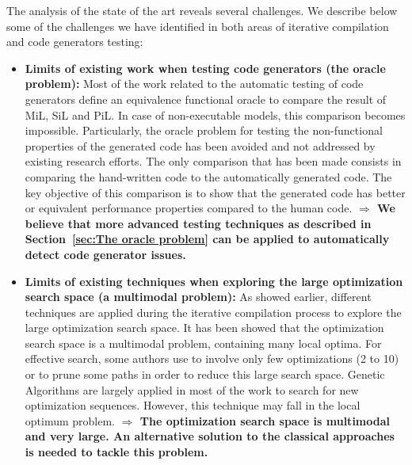 The analysis of the state of the art reveals several challenges. We describe below some of the challenges we have identified in both areas of iterative compilation and code generators testing:
\begin{itemize}
	
\item \textbf{Limits of existing work when testing code generators (the oracle problem):} Most of the work related to the automatic testing of code generators define an equivalence functional oracle to compare the result of MiL, SiL and PiL. In case of non-executable models, this comparison becomes impossible. Particularly, the oracle problem for testing the non-functional properties of the generated code  has been avoided and not addressed by existing research efforts. The only comparison that has been made consists in comparing the hand-written code to the automatically generated code. The key objective of this comparison is to show that the generated code has better or equivalent performance properties compared to the human code.\newline
\textbf{$\Rightarrow$ 
	We believe that more advanced testing techniques as described in Section~\ref{sec:The oracle problem} can be applied to automatically detect code generator issues.}
	
\item \textbf{Limits of existing techniques when exploring the large optimization search space (a multimodal problem):}
As showed earlier, different techniques are applied during the iterative compilation process to explore the large optimization search space. It has been showed that the optimization search space is a multimodal problem, containing many local optima.
For effective search, some authors use to involve only few optimizations (2 to 10) or to prune some paths in order to reduce this large search space.
Genetic Algorithms are largely applied in most of the work to search for new optimization sequences. However, this technique may fall in the local optimum problem. 
\newline
\textbf{$\Rightarrow$ The optimization search space is multimodal and very large. An alternative solution to the classical approaches is needed to tackle this problem.}
	

\end{itemize}
